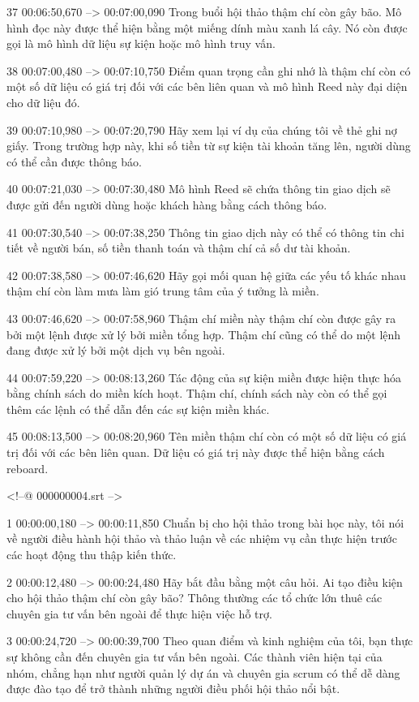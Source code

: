 37
00:06:50,670 --> 00:07:00,090
Trong buổi hội thảo thậm chí còn gây bão.  Mô hình đọc này được thể hiện bằng một miếng dính màu xanh lá cây.  Nó còn được gọi là mô hình dữ liệu sự kiện hoặc mô hình truy vấn.

38
00:07:00,480 --> 00:07:10,750
Điểm quan trọng cần ghi nhớ là thậm chí còn có một số dữ liệu có giá trị đối với các bên liên quan và mô hình Reed này đại diện cho dữ liệu đó.

39
00:07:10,980 --> 00:07:20,790
Hãy xem lại ví dụ của chúng tôi về thẻ ghi nợ giấy.  Trong trường hợp này, khi số tiền từ sự kiện tài khoản tăng lên, người dùng có thể cần được thông báo.

40
00:07:21,030 --> 00:07:30,480
Mô hình Reed sẽ chứa thông tin giao dịch sẽ được gửi đến người dùng hoặc khách hàng bằng cách thông báo.

41
00:07:30,540 --> 00:07:38,250
Thông tin giao dịch này có thể có thông tin chi tiết về người bán, số tiền thanh toán và thậm chí cả số dư tài khoản.

42
00:07:38,580 --> 00:07:46,620
Hãy gọi mối quan hệ giữa các yếu tố khác nhau thậm chí còn làm mưa làm gió trung tâm của ý tưởng là miền.

43
00:07:46,620 --> 00:07:58,960
Thậm chí miền này thậm chí còn được gây ra bởi một lệnh được xử lý bởi miền tổng hợp.  Thậm chí cũng có thể do một lệnh đang được xử lý bởi một dịch vụ bên ngoài.

44
00:07:59,220 --> 00:08:13,260
Tác động của sự kiện miền được hiện thực hóa bằng chính sách do miền kích hoạt.  Thậm chí, chính sách này còn có thể gọi thêm các lệnh có thể dẫn đến các sự kiện miền khác.

45
00:08:13,500 --> 00:08:20,960
Tên miền thậm chí còn có một số dữ liệu có giá trị đối với các bên liên quan.  Dữ liệu có giá trị này được thể hiện bằng cách reboard.

<!--@ 000000004.srt -->

1
00:00:00,180 --> 00:00:11,850
Chuẩn bị cho hội thảo trong bài học này, tôi nói về người điều hành hội thảo và thảo luận về các nhiệm vụ cần thực hiện trước các hoạt động thu thập kiến ​​thức.

2
00:00:12,480 --> 00:00:24,480
Hãy bắt đầu bằng một câu hỏi.  Ai tạo điều kiện cho hội thảo thậm chí còn gây bão?  Thông thường các tổ chức lớn thuê các chuyên gia tư vấn bên ngoài để thực hiện việc hỗ trợ.

3
00:00:24,720 --> 00:00:39,700
Theo quan điểm và kinh nghiệm của tôi, bạn thực sự không cần đến chuyên gia tư vấn bên ngoài.  Các thành viên hiện tại của nhóm, chẳng hạn như người quản lý dự án và chuyên gia scrum có thể dễ dàng được đào tạo để trở thành những người điều phối hội thảo nổi bật.

